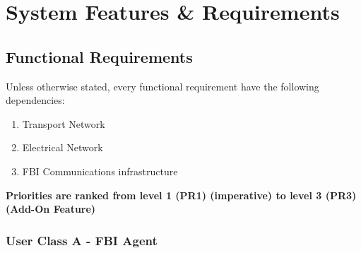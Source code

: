 \documentclass[12pt]{article}
\begin{document}
\section{System Features \& Requirements}

\subsection{Functional Requirements}

Unless otherwise stated, every functional requirement have the following dependencies:
\begin{enumerate}
    \item Transport Network
    \item Electrical Network
    \item FBI Communications infrastructure
\end{enumerate}
\textbf{Priorities are ranked from level 1 (PR1) (imperative) to level 3 (PR3) (Add-On Feature)}

\subsubsection{User Class A - FBI Agent}
\end{document}
